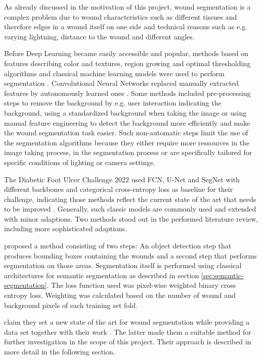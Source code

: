 As already discussed in the motivation of this project, wound segmentation is a complex problem due to wound characteristics such as different tissues and therefore edges in a wound itself on one side and technical reasons such as e.g. varying lightning, distance to the wound and different angles. 

Before Deep Learning became easily accessible and popular, methods based on features describing color and textures, region growing and optimal thresholding algorithms and classical machine learning models were used to perform segmentation \cite{Scebba2022}. Convolutional Neural Networks replaced manually extracted features by autonomously learned ones \cite{Scebba2022}. Some methods included pre-processing steps to remove the background by e.g. user interaction indicating the background, using a standardized background when taking the image or using manual feature engineering to detect the background more efficiently and make the wound segmentation task easier. Such non-automatic steps limit the use of the segmentation algorithms because they either require more ressources in the image taking process, in the segmentation process or are specifically tailored for specific conditions of lighting or camera settings.

The Diabetic Foot Ulcer Challenge 2022 used FCN, U-Net and SegNet with different backbones and categorical cross-entropy loss as baseline for their challenge, indicating those methods reflect the current state of the art that needs to be improved \cite{DFUC2022}. Generally, such classic models are commonly used and extended with minor adaptions. Two methods stood out in the performed literature review, including more sophisticated adaptions.

\citeauthor{Scebba2022} proposed a method consisting of two steps: An object detection step that produces bounding boxes containing the wounds and a second step that performs segmentation on those areas. Segmentation itself is performed using classical architectures for semantic segmentation as described in section \ref{sec:semantic-segmentation}. The loss function used was pixel-wise weighted binary cross entropy loss. Weighting was calculated based on the number of wound and background pixels of each training set fold.

\citeauthor{Oota_2023_WACV} claim they set a new state of the art for wound segmentation while providing a data set together with their work \cite{Oota_2023_WACV}. The latter made them a suitable method for further investigation in the scope of this project. Their approach is described in more detail in the following section.

